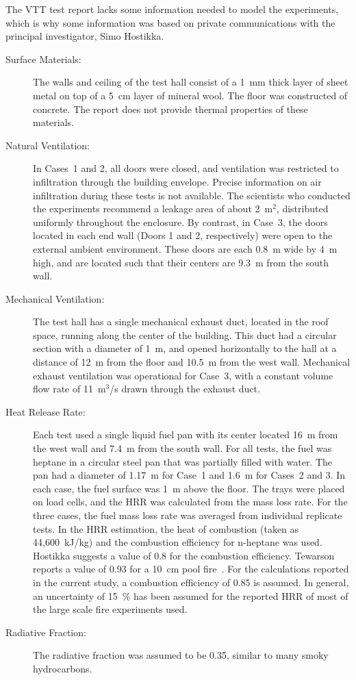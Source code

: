 The VTT test report lacks some information needed to model the experiments, which is why some information was based on private communications with the
principal investigator, Simo Hostikka.
\begin{description}
\item[Surface Materials:] The walls and ceiling of the test hall consist of a 1~mm thick layer of sheet metal on top of a 5~cm layer of
mineral wool. The floor was constructed of concrete. The report does not provide thermal properties of these materials.
\item[Natural Ventilation:] In Cases~1 and 2, all doors were closed, and ventilation was restricted to infiltration through the building envelope. Precise
information on air infiltration during these tests is not available. The scientists who conducted the experiments recommend a leakage area of about 2~m$^2$,
distributed uniformly throughout the enclosure. By contrast, in Case~3, the doors located in each end wall (Doors 1 and 2, respectively)
were open to the external ambient environment. These doors are each 0.8~m wide by 4~m high, and are located such that their centers
are 9.3~m from the south wall.
\item[Mechanical Ventilation:] The test hall has a single mechanical exhaust duct, located in the roof space, running along the center of the building. This
duct had a circular section with a diameter of 1~m, and opened horizontally to the hall at a distance of 12~m from the floor and 10.5~m from the west wall.
Mechanical exhaust ventilation was operational for Case~3, with a constant volume flow rate of 11~m$^3$/s drawn through
the exhaust duct.
\item[Heat Release Rate:] Each test used a single liquid fuel pan with its center located 16~m from the west
wall and 7.4~m from the south wall. For all tests, the fuel was heptane in a circular steel pan that was partially filled with water. The
pan had a diameter of 1.17~m for Case~1 and 1.6~m for Cases~2 and 3. In each case, the fuel surface was 1~m above the
floor. The trays were placed on load cells, and the HRR was calculated from the mass loss rate. For the three cases,
the fuel mass loss rate was averaged from individual replicate tests. In the HRR estimation, the heat of combustion (taken as 44,600~kJ/kg) and the
combustion efficiency for n-heptane was used. Hostikka suggests a value of 0.8 for the combustion efficiency.
Tewarson reports a value of 0.93 for a 10~cm pool fire~\cite{SFPE:Tewarson}. For the calculations reported in the current
study, a combustion efficiency of 0.85 is assumed. In general, an uncertainty of 15~\% has been assumed for the reported HRR of most of the large
scale fire experiments used.
\item[Radiative Fraction:] The radiative fraction was assumed to be 0.35, similar to many smoky hydrocarbons.
\end{description}
